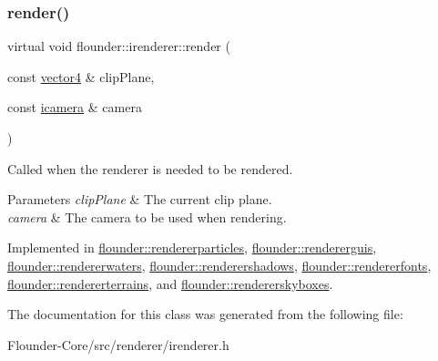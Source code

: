 \subsubsection{\texorpdfstring{render()}{render()}}
{\footnotesize\ttfamily virtual void flounder\+::irenderer\+::render (\begin{DoxyParamCaption}\item[{const \hyperlink{classflounder_1_1vector4}{vector4} \&}]{clip\+Plane,  }\item[{const \hyperlink{classflounder_1_1icamera}{icamera} \&}]{camera }\end{DoxyParamCaption})\hspace{0.3cm}{\ttfamily [pure virtual]}}



Called when the renderer is needed to be rendered. 


\begin{DoxyParams}{Parameters}
{\em clip\+Plane} & The current clip plane. \\
\hline
{\em camera} & The camera to be used when rendering. \\
\hline
\end{DoxyParams}


Implemented in \hyperlink{classflounder_1_1rendererparticles_a6e91dff06e264e9b6140225d6bfa1ce6}{flounder\+::rendererparticles}, \hyperlink{classflounder_1_1rendererguis_afdf543d9a5dfbe3c7fdd9d266dd34981}{flounder\+::rendererguis}, \hyperlink{classflounder_1_1rendererwaters_a2adb0c22d5aa6c76fb6eee3f69239398}{flounder\+::rendererwaters}, \hyperlink{classflounder_1_1renderershadows_ae07dca156c479cdb82e8821a4f29a6c3}{flounder\+::renderershadows}, \hyperlink{classflounder_1_1rendererfonts_a7702e992c6546d06019ce2ef1bf68c33}{flounder\+::rendererfonts}, \hyperlink{classflounder_1_1rendererterrains_a3e8560c23b117b52a369a8f17b2bd39e}{flounder\+::rendererterrains}, and \hyperlink{classflounder_1_1rendererskyboxes_a436679aedf4ea978d8683f2dfe82ecd5}{flounder\+::rendererskyboxes}.



The documentation for this class was generated from the following file\+:\begin{DoxyCompactItemize}
\item 
Flounder-\/\+Core/src/renderer/irenderer.\+h\end{DoxyCompactItemize}
